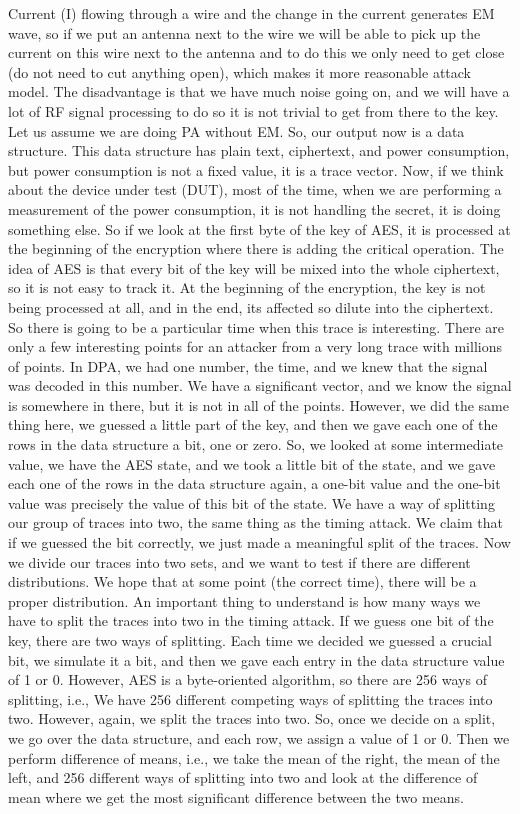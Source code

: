 Current (I) flowing through a wire and the change in the current generates EM
wave, so if we put an antenna next to the wire we will be able to pick up the
current on this wire next to the antenna and to do this we only need to get
close (do not need to cut anything open), which makes it more reasonable attack
model. The disadvantage is that we have much noise going on, and we will
have a lot of RF signal processing to do so it is not trivial to get from there
to the key. Let us assume we are doing PA without EM. So, our output now is a
data structure. This data structure has plain text, ciphertext, and power
consumption, but power consumption is not a fixed value, it is a trace vector.
Now, if we think about the device under test (DUT), most of the time, when we are
performing a measurement of the power consumption, it is not handling the
secret, it is doing something else. So if we look at the first byte of the key of
AES, it is processed at the beginning of the encryption where there is adding the
critical operation. The idea of AES is that every bit of the key will be mixed into
the whole ciphertext, so it is not easy to track it. At the beginning of
the encryption, the key is not being processed at all, and in the end, its affected
so dilute into the ciphertext. So there is going to be a particular time when
this trace is interesting. There
are only a few interesting points for an attacker from a very long trace with millions of points. In DPA, we had one number, the
time, and we knew that the signal was decoded in this number. We have a significant
vector, and we know the signal is somewhere in there, but it is not in all of the
points. However, we did the same thing here, we guessed a little part of the key, and then
we gave each one of the rows in the data structure a bit, one or zero. So, we
looked at some intermediate value, we have the AES state, and we took a
little bit of the state, and we gave each one of the rows in the data structure
again, a one-bit value and the one-bit value was precisely the value of this bit
of the state. We have a way of splitting our group of traces into two,
the same thing as the timing attack. We claim that if we guessed the bit correctly,
we just made a meaningful split of the traces. Now we divide our traces into two
sets, and we want to test if there are different distributions. We hope that at
some point (the correct time), there will be a proper distribution. An important
thing to understand is how many ways we have to split the traces into two in the
timing attack. If we guess one bit of the key, there are two ways of splitting.
Each time we decided we guessed a crucial bit, we simulate it a bit, and then
we gave each entry in the data structure value of 1 or 0. However, AES is a
byte-oriented algorithm, so there are 256 ways of splitting, i.e., We have 256
different competing ways of splitting the traces into two. However, again, we split
the traces into two. So, once we decide on a split, we go over the data structure, and each row, we assign a value of 1 or 0. Then we perform difference of means,
i.e., we take the mean of the right, the mean of the left, and 256
different ways of splitting into two and look at the difference of mean where we
get the most significant difference between the two means.

